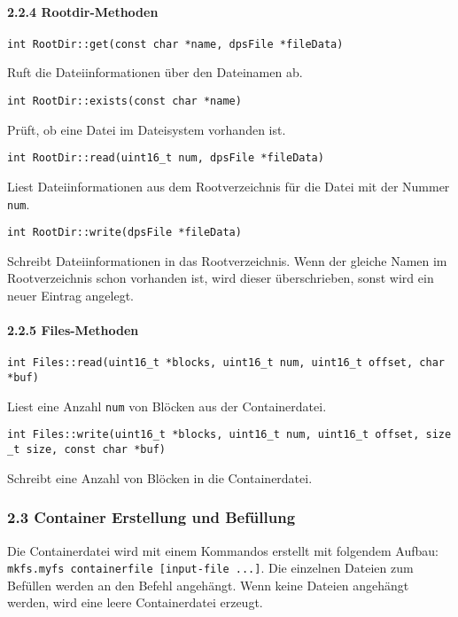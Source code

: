 \documentclass[]{article}
\let\oldparagraph\paragraph
\renewcommand{\paragraph}[1]{\oldparagraph{#1}\mbox{}}
\begin{document}
\hypertarget{rootdir-methoden}{%
\paragraph{2.2.4 Rootdir-Methoden}\label{rootdir-methoden}}

\texttt{int\ RootDir::get(const\ char\ *name,\ dpsFile\ *fileData)}

Ruft die Dateiinformationen über den Dateinamen ab.

\texttt{int\ RootDir::exists(const\ char\ *name)}

Prüft, ob eine Datei im Dateisystem vorhanden ist.

\texttt{int\ RootDir::read(uint16\_t\ num,\ dpsFile\ *fileData)}

Liest Dateiinformationen aus dem Rootverzeichnis für die Datei mit der
Nummer \texttt{num}.

\texttt{int\ RootDir::write(dpsFile\ *fileData)}

Schreibt Dateiinformationen in das Rootverzeichnis. Wenn der gleiche
Namen im Rootverzeichnis schon vorhanden ist, wird dieser überschrieben,
sonst wird ein neuer Eintrag angelegt.

\hypertarget{files-methoden}{%
\paragraph{2.2.5 Files-Methoden}\label{files-methoden}}

\texttt{int\ Files::read(uint16\_t\ *blocks,\ uint16\_t\ num,\ uint16\_t\ offset,\ char\ *buf)}

Liest eine Anzahl \texttt{num} von Blöcken aus der Containerdatei.

\texttt{int\ Files::write(uint16\_t\ *blocks,\ uint16\_t\ num,\ uint16\_t\ offset,\ size\_t\ size,\ const\ char\ *buf)}

Schreibt eine Anzahl von Blöcken in die Containerdatei.

\hypertarget{container-erstellung-und-befuxfcllung}{%
\subsubsection{2.3 Container Erstellung und
Befüllung}\label{container-erstellung-und-befuxfcllung}}

Die Containerdatei wird mit einem Kommandos erstellt mit folgendem
Aufbau: \texttt{mkfs.myfs\ containerfile\ {[}input-file\ ...{]}}. Die
einzelnen Dateien zum Befüllen werden an den Befehl angehängt. Wenn
keine Dateien angehängt werden, wird eine leere Containerdatei erzeugt.
\end{document}
